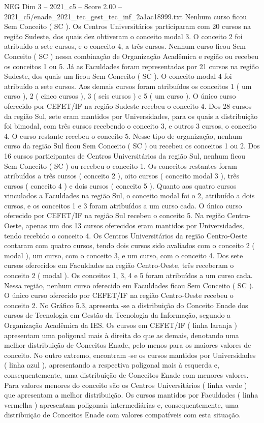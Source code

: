 \begin{textsample}{NEG Dim 3 – 2021\_c5 – Score 2.00 – 2021\_c5/enade\_2021\_tec\_gest\_tec\_inf\_2a1ac18999.txt}
Nenhum curso ficou Sem Conceito ( SC ).
Os Centros Universitários participaram com 20 cursos na região Sudeste, dos quais dez obtiveram o conceito modal 3.
O conceito 2 foi atribuído a sete cursos, e o conceito 4, a três cursos.
Nenhum curso ficou Sem Conceito ( SC ) nessa combinação de Organização Acadêmica e região ou recebeu os conceitos 1 ou 5.
Já as Faculdades foram representadas por 21 cursos na região Sudeste, dos quais um ficou Sem Conceito ( SC ).
O conceito modal 4 foi atribuído a sete cursos.
Aos demais cursos foram atribuídos os conceitos 1 ( um curso ), 2 ( cinco cursos ), 3 ( seis cursos ) e 5 ( um curso ).
O único curso oferecido por CEFET/IF na região Sudeste recebeu o conceito 4.
Dos 28 cursos da região Sul, sete eram mantidos por Universidades, para os quais a distribuição foi bimodal, com três cursos recebendo o conceito 3, e outros 3 cursos, o conceito 4.
O curso restante recebeu o conceito 5.
Nesse tipo de organização, nenhum curso da região Sul ficou Sem Conceito ( SC ) ou recebeu os conceitos 1 ou 2.
Dos 16 cursos participantes de Centros Universitários da região Sul, nenhum ficou Sem Conceito ( SC ) ou recebeu o conceito 1.
Os conceitos restantes foram atribuídos a três cursos ( conceito 2 ), oito cursos ( conceito modal 3 ), três cursos ( conceito 4 ) e dois cursos ( conceito 5 ).
Quanto aos quatro cursos vinculados a Faculdades na região Sul, o conceito modal foi o 2, atribuído a dois cursos, e os conceitos 1 e 3 foram atribuídos a um curso cada.
O único curso oferecido por CEFET/IF na região Sul recebeu o conceito 5.
Na região Centro-Oeste, apenas um dos 13 cursos oferecidos eram mantidos por Universidades, tendo recebido o conceito 4.
Os Centros Universitários da região Centro-Oeste contaram com quatro cursos, tendo dois cursos sido avaliados com o conceito 2 ( modal ), um curso, com o conceito 3, e um curso, com o conceito 4.
Dos sete cursos oferecidos em Faculdades na região Centro-Oeste, três receberam o conceito 2 ( modal ).
Os conceitos 1, 3, 4 e 5 foram atribuídos a um curso cada.
Nessa região, nenhum curso oferecido em Faculdades ficou Sem Conceito ( SC ).
O único curso oferecido por CEFET/IF na região Centro-Oeste recebeu o conceito 2.
No Gráfico 5.3, apresenta -se a distribuição do Conceito Enade dos cursos de Tecnologia em Gestão da Tecnologia da Informação, segundo a Organização Acadêmica da IES.
Os cursos em CEFET/IF ( linha laranja ) apresentam uma poligonal mais à direita do que as demais, denotando uma melhor distribuição de Conceitos Enade, pelo menos para os maiores valores de conceito.
No outro extremo, encontram -se os cursos mantidos por Universidades ( linha azul ), apresentando a respectiva poligonal mais à esquerda e, consequentemente, uma distribuição de Conceitos Enade com menores valores.
Para valores menores do conceito são os Centros Universitários ( linha verde ) que apresentam a melhor distribuição.
Os cursos mantidos por Faculdades ( linha vermelha ) apresentam poligonais intermediárias e, consequentemente, uma distribuição de Conceitos Enade com valores compatíveis com esta situação.

\end{textsample}

